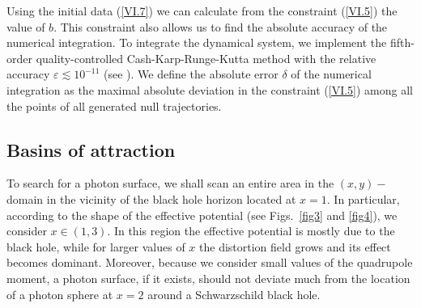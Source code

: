 \documentclass[twocolumn,showpacs,preprintnumbers,amsmath,amssymb,floatfix,nofootinbib]{revtex4-1}
\newcommand{\eq}[1]{(\ref{#1})}
\begin{document}
Using the initial data \eq{VI.7} we can calculate from the constraint \eq{VI.5} the value of $b$. This constraint also allows us to find the absolute accuracy of the numerical integration. To integrate the dynamical system, we implement the fifth-order quality-controlled Cash-Karp-Runge-Kutta method with the relative accuracy $\varepsilon\lesssim10^{-11}$ (see \cite{PTVF}). We define the absolute error $\delta$ of the numerical integration as the maximal absolute deviation in the constraint \eq{VI.5} among all the points of all generated null trajectories. 

\subsection{Basins of attraction}

To search for a photon surface, we shall scan an entire area in the $(x,y)-$domain in the vicinity of the black hole horizon located at $x=1$. In particular, according to the shape of the effective potential (see Figs.~\ref{fig3} and \ref{fig4}), we consider $x\in(1,3)$. In this region the effective potential is mostly due to the black hole, while for larger values of $x$ the distortion field grows and its effect becomes dominant. Moreover, because we consider small values of the quadrupole moment, a photon surface, if it exists, should not deviate much from the location of a photon sphere at $x=2$ around a Schwarzschild black hole.
\end{document}
